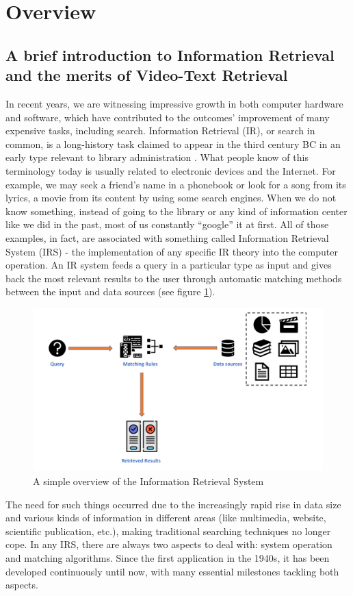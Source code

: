 \section{Overview}
\label{sec:overview}

\subsection{A brief introduction to Information Retrieval and the merits of Video-Text Retrieval}
In recent years, we are witnessing impressive growth in both computer hardware and software, which have contributed to the outcomes’ improvement of many expensive tasks, including search.
Information Retrieval (IR), or search in common, is a long-history task claimed to appear in the third century BC in an early type relevant to library administration \cite{eliot2009companion}.
What people know of this terminology today is usually related to electronic devices and the Internet. For example, we may seek a friend’s name in a phonebook or look for a song from its lyrics, a movie from its content by using some search engines.
When we do not know something, instead of going to the library or any kind of information center like we did in the past, most of us constantly “google” it at first.
All of those examples, in fact, are associated with something called Information Retrieval System (IRS) - the implementation of any specific IR theory into the computer operation.
An IR system feeds a query in a particular type as input and gives back the most relevant results to the user through automatic matching methods between the input and data sources (see figure \ref{fig:IR_structure}).
\begin{figure}[!t]
    \centering
    \includegraphics[width=\linewidth]{images/overview/IR_structure.pdf}
    \caption{A simple overview of the Information Retrieval System}
    \label{fig:IR_structure}
\end{figure}
The need for such things occurred due to the increasingly rapid rise in data size and various kinds of information in different areas (like multimedia, website, scientific publication, etc.), making traditional searching techniques no longer cope.
In any IRS, there are always two aspects to deal with: system operation and matching algorithms. Since the first application in the 1940s, it has been developed continuously until now, with many essential milestones \cite{sanderson2012history} tackling both aspects.


